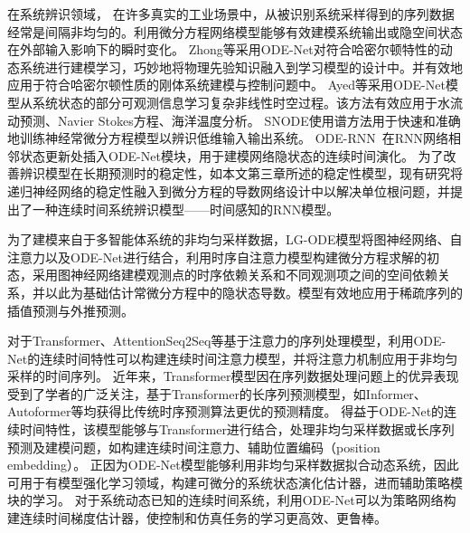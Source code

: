 在系统辨识领域，
在许多真实的工业场景中，从被识别系统采样得到的序列数据经常是间隔非均匀的。利用微分方程网络模型能够有效建模系统输出或隐空间状态在外部输入影响下的瞬时变化。
Zhong等\cite{zhong2019symplectic}采用ODE-Net对符合哈密尔顿特性的动态系统进行建模学习，巧妙地将物理先验知识融入到学习模型的设计中。并有效地应用于符合哈密尔顿性质的刚体系统建模与控制问题中。
Ayed等\cite{ayed2019learning}采用ODE-Net模型从系统状态的部分可观测信息学习复杂非线性时空过程。该方法有效应用于水流动预测、Navier Stokes方程、海洋温度分析。
SNODE\cite{Quaglino2019}使用谱方法用于快速和准确地训练神经常微分方程模型以辨识低维输入输出系统。
ODE-RNN~\cite{Rubanova2019}在RNN网络相邻状态更新处插入ODE-Net模块，用于建模网络隐状态的连续时间演化。
为了改善辨识模型在长期预测时的稳定性，如本文第三章所述的稳定性模型，现有研究\cite{Demeester2019,Yuan2022}将递归神经网络的稳定性融入到微分方程的导数网络设计中以解决单位根问题，并提出了一种连续时间系统辨识模型——时间感知的RNN模型。

为了建模来自于多智能体系统的非均匀采样数据，LG-ODE模型\cite{Huang2020}将图神经网络、自注意力以及ODE-Net进行结合，利用时序自注意力模型构建微分方程求解的初态，采用图神经网络建模观测点的时序依赖关系和不同观测项之间的空间依赖关系，并以此为基础估计常微分方程中的隐状态导数。模型有效地应用于稀疏序列的插值预测与外推预测。


对于Transformer、AttentionSeq2Seq等基于注意力的序列处理模型，利用ODE-Net的连续时间特性可以构建连续时间注意力模型\cite{chen2021continuous}，并将注意力机制应用于非均匀采样的时间序列。
近年来，Transformer模型\cite{Vaswani2017}因在序列数据处理问题上的优异表现受到了学者的广泛关注，基于Transformer的长序列预测模型，如Informer\cite{Zhou2020}、Autoformer\cite{Wu2021}等均获得比传统时序预测算法更优的预测精度。
得益于ODE-Net的连续时间特性，该模型能够与Transformer进行结合，处理非均匀采样数据或长序列预测及建模问题，如构建连续时间注意力\cite{chen2021continuous}、辅助位置编码（position embedding）\cite{Liu2020}。
正因为ODE-Net模型能够利用非均匀采样数据拟合动态系统，因此可用于有模型强化学习\cite{Yildiz2021}领域，构建可微分的系统状态演化估计器，进而辅助策略模块的学习。
对于系统动态已知的连续时间系统，利用ODE-Net可以为策略网络构建连续时间梯度估计器\cite{Ainsworth2020}，使控制和仿真任务的学习更高效、更鲁棒。


